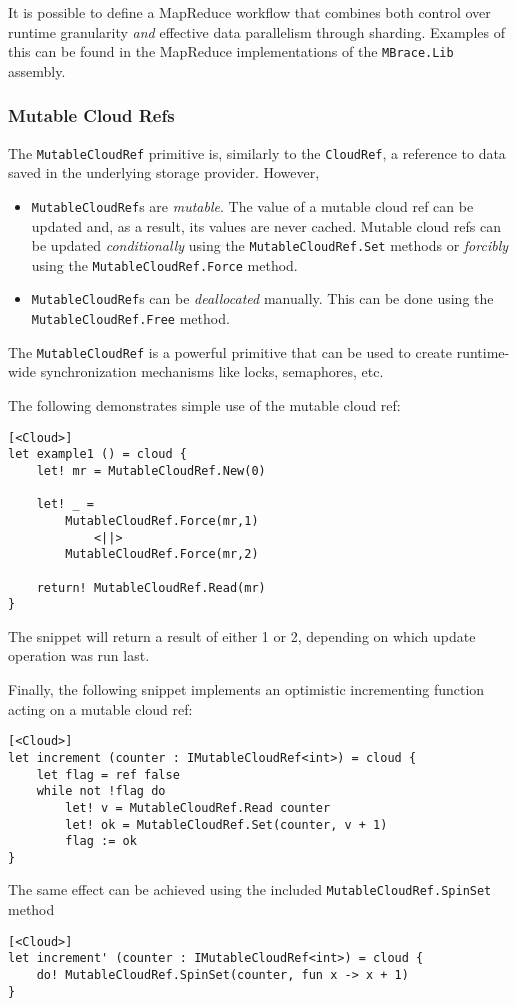 It is possible to define a MapReduce workflow that combines both control
over runtime granularity \emph{and} effective data parallelism through sharding.
Examples of this can be found in the MapReduce implementations of the \texttt{MBrace.Lib}
assembly.

\subsubsection*{Mutable Cloud Refs}
\label{mutableCloudRef}

The \texttt{MutableCloudRef} primitive is, similarly to the \texttt{CloudRef},
a reference to data saved in the underlying storage provider. However,
\begin{itemize}
\item \texttt{MutableCloudRef}s are \emph{mutable}. The value of a mutable cloud ref
can be updated and, as a result, its values are never cached. Mutable cloud refs can
be updated \emph{conditionally} using the \texttt{MutableCloudRef.Set} methods or 
\emph{forcibly} using the \texttt{MutableCloudRef.Force} method.
\item \texttt{MutableCloudRef}s can be \emph{deallocated} manually. This can be done
using the \texttt{MutableCloudRef.Free} method.
\end{itemize}
The \texttt{MutableCloudRef} is a powerful primitive that can be used to create 
runtime-wide synchronization mechanisms like locks, semaphores, etc.

The following demonstrates simple use of the mutable cloud ref:
\begin{lstlisting}
[<Cloud>]
let example1 () = cloud {
    let! mr = MutableCloudRef.New(0)
 
    let! _ = 
    	MutableCloudRef.Force(mr,1)
    		<||> 
    	MutableCloudRef.Force(mr,2)
 
    return! MutableCloudRef.Read(mr)
}
\end{lstlisting}
The snippet will return a result of either 1 or 2, depending on which update operation
was run last.

Finally, the following snippet implements an optimistic incrementing function
acting on a mutable cloud ref:
\begin{lstlisting}
[<Cloud>]
let increment (counter : IMutableCloudRef<int>) = cloud {
    let flag = ref false
    while not !flag do
        let! v = MutableCloudRef.Read counter
        let! ok = MutableCloudRef.Set(counter, v + 1)
        flag := ok
}
\end{lstlisting}
The same effect can be achieved using the included 
\texttt{MutableCloudRef.SpinSet} method
\begin{lstlisting}
[<Cloud>]
let increment' (counter : IMutableCloudRef<int>) = cloud {
    do! MutableCloudRef.SpinSet(counter, fun x -> x + 1)
}
\end{lstlisting}


